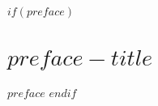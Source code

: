 \documentclass[
  a4paper, %
  fontsize=10pt, %
  twoside=true, %
  numbers=noenddot, %
]{kaobook}
\begin{document}

\maketitle


$if(preface)$
\chapter*{$preface-title$}

$preface$
%
$endif$


\begingroup %

\setlength{\textheight}{230\hscale} %

\etocstandarddisplaystyle %
\etocstandardlines %

\tableofcontents %

\listoffigures %

\let\cleardoublepage\bigskip
\let\clearpage\bigskip

\listoftables %

\endgroup

\end{document}
